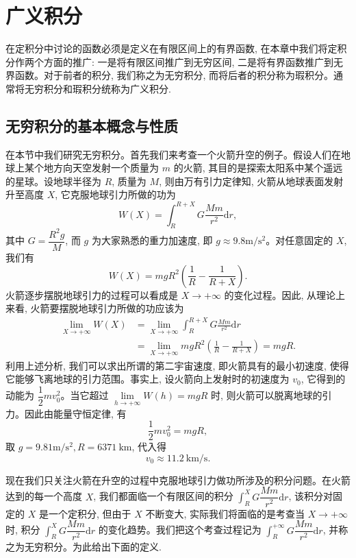 \setcounter{chapter}{7} %
\chapter{广义积分}
\label{chap:ma-8}

在定积分中讨论的函数必须是定义在有限区间上的有界函数, 在本章中我们将定积分作两个方面的推广: 一是将有限区间推广到无穷区间, 二是将有界函数推广到无界函数。对于前者的积分, 我们称之为无穷积分, 而将后者的积分称为瑕积分。通常将无穷积分和瑕积分统称为广义积分.

\section{无穷积分的基本概念与性质}
\label{sec:ma-8-1}

在本节中我们研究无穷积分。首先我们来考查一个火箭升空的例子。假设人们在地球上某个地方向天空发射一个质量为 $m$ 的火箭, 其目的是探索太阳系中某个遥远的星球。设地球半径为 $R$, 质量为 $M$, 则由万有引力定律知, 火箭从地球表面发射升至高度 $X$, 它克服地球引力所做的功为
\[
  W(X)=\int_R^{R+X}G\frac{Mm}{r^2}\mathrm dr,
\]
其中 $G=\dfrac{R^2g}{M}$, 而 $g$ 为大家熟悉的重力加速度, 即 $g\approx9.8\mathrm{m}/\mathrm{s}^2$。对任意固定的 $X$, 我们有
\[
  W(X)=mgR^2\left(\frac1R-\frac1{R+X}\right).
\]
火箭逐步摆脱地球引力的过程可以看成是 $X\to+\infty$ 的变化过程。因此, 从理论上来看, 火箭要摆脱地球引力所做的功应该为
\[
\begin{aligned}
  \lim_{X\to+\infty}W(X)
  &=\lim_{X\to+\infty}\int_R^{R+X}G\frac{Mm}{r^2}\mathrm dr\\
  &=\lim_{X\to+\infty}mgR^2\left(\frac1R-\frac1{R+X}\right)=mgR.
\end{aligned}
\]
利用上述分析, 我们可以求出所谓的第二宇宙速度, 即火箭具有的最小初速度, 使得它能够飞离地球的引力范围。事实上, 设火箭向上发射时的初速度为 $v_0$, 它得到的动能为 $\dfrac12mv_0^2$。当它超过 $\lim\limits_{h\to+\infty}W(h)=mgR$ 时, 则火箭可以脱离地球的引力。因此由能量守恒定律, 有
\[
  \frac12mv_0^2=mgR,
\]
取 $g=9.81\mathrm{m}/\mathrm{s}^2,R=6371\ \mathrm{km}$, 代入得
\[
  v_0\approx11.2\ \mathrm{km}/\mathrm{s}.
\]

现在我们只关注火箭在升空的过程中克服地球引力做功所涉及的积分问题。在火箭达到的每一个高度 $X$, 我们都面临一个有限区间的积分 $\int_R^X G\dfrac{Mm}{r^2}\mathrm dr$, 该积分对固定的 $X$ 是一个定积分, 但由于 $X$ 不断变大, 实际我们将面临的是考查当 $X\to+\infty$ 时, 积分 $\int_R^X G\dfrac{Mm}{r^2}\mathrm dr$ 的变化趋势。我们把这个考查过程记为 $\int_R^{+\infty}G\dfrac{Mm}{r^2}\mathrm dr$, 并称之为无穷积分。为此给出下面的定义.

